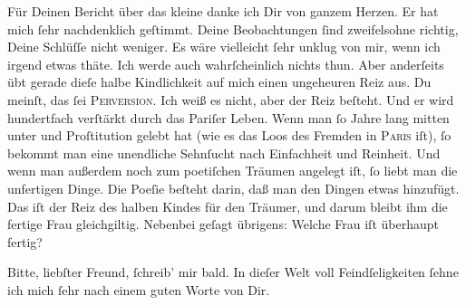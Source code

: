 \pstart
           Für Deinen Bericht über das kleine \label{K_L02833-6v}\label{K_L02833-6} danke ich Dir von ganzem Herzen. Er hat mich ſehr nachdenklich geſtimmt.
               Deine Beobachtungen {\pb}ſind zweifelsohne richtig,
               Deine  Schlüſſe nicht weniger. Es wäre vielleicht ſehr unklug von mir, wenn ich
               irgend etwas thäte. Ich werde auch wahrſcheinlich nichts thun. Aber anderſeits übt
               gerade dieſe halbe Kindlichkeit auf mich  einen ungeheuren Reiz aus. Du meinſt, das ſei \textsc{Perversion}. Ich weiß es nicht, aber der Reiz beſteht. Und er wird
               hundertfach verſtärkt durch das Pariſer Leben.
               Wenn man ſo Jahre lang mitten unter \label{K_L02833-7v}\label{K_L02833-7} und Proſtitution gelebt hat (wie es das Loos des Fremden in \textsc{Paris} iſt), ſo bekommt man eine unendliche Sehnſucht nach {\pb}Einfachheit und Reinheit. Und wenn man außerdem noch
               zum poetiſchen Träumen  angelegt iſt, ſo liebt man
               die unfertigen Dinge. Die Poeſie beſteht darin, daß man den Dingen etwas hinzufügt.
               Das iſt der Reiz des halben Kindes für den Träumer, und darum bleibt \strikeout{\textcolor{gray}{×}\-\textcolor{gray}{×}} ihm die fertige Frau gleichgiltig. Nebenbei geſagt übrigens: Welche Frau iſt
               überhaupt fertig?\pend
           
\pstart
           Bitte, liebſter Freund, ſchreib’ mir bald. In dieſer {\pb}Welt voll Feindſeligkeiten ſehne ich mich ſehr nach einem guten Worte von Dir.\pend
           
